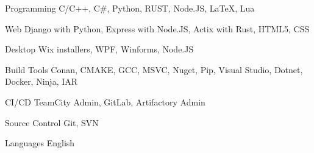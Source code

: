 

\begin{cvskills}


\cvskill
{Programming} %
{C/C++, C\#, Python, RUST, Node.JS, LaTeX, Lua} %


\cvskill
{Web} %
{Django with Python, Express with Node.JS, Actix with Rust, HTML5, CSS} %


\cvskill
{Desktop} %
{Wix installers, WPF, Winforms, Node.JS} %


\cvskill
{Build Tools} %
{Conan, CMAKE, GCC, MSVC, Nuget, Pip, Visual Studio, Dotnet, Docker, Ninja, IAR} %


\cvskill
{CI/CD} %
{TeamCity Admin, GitLab, Artifactory Admin} %


\cvskill
{Source Control} %
{Git, SVN} %

\cvskill
{Languages} %
{English} %


\end{cvskills}

